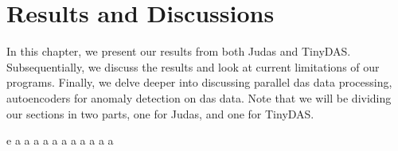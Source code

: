 \chapter{Results and Discussions}
\label{chap:results}

In this chapter, we present our results from both Judas and TinyDAS. Subsequentially, we discuss the results and look at current limitations of our programs. Finally, we delve deeper into discussing parallel \acrshort{das} data processing, autoencoders for anomaly detection on \acrshort{das} data. Note that we will be dividing our sections in two parts, one for Judas, and one for TinyDAS.






e \cite{projthesis}
a \cite{claerbout1991scrutiny}
a \cite{landes1951scrutiny}
a \cite{omar2013machine}
a \cite{wei2022lstmautoencoder}
a \cite{julia}
a \cite{apSensing2019railwaydas}
a \cite{DBLP:journals/corr/SrivastavaMS15}
a \cite{2011ndongsigprocandet}
a \cite{doi:10.1137/141000671}
a \cite{bioengineering10040405}
a \cite{maulik2020recurrent}







